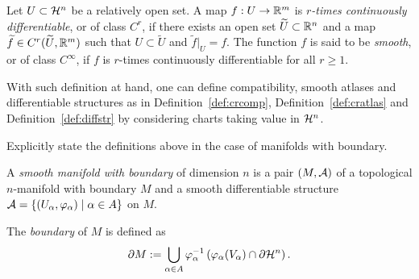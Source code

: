 \begin{definition}
  Let $U\subset\mathcal{H}^n$ be a relatively open set. A map $f: U\to\mathbb{R}^m$ is \emph{$r$-times continuously differentiable}, or of class $C^r$, if there exists an open set $\widetilde U\subset\mathbb{R}^n$ and a map $\widetilde f\in C^r(\widetilde U, \mathbb{R}^m)$ such that $U\subset\widetilde U$ and $\widetilde f|_U = f$.
  The function $f$ is said to be \emph{smooth}, or of class $C^\infty$, if $f$ is $r$-times continuously differentiable for all $r\geq 1$.
\end{definition}

With such definition at hand, one can define compatibility, smooth atlases and differentiable structures as in Definition~\ref{def:crcomp}, Definition~\ref{def:cratlas} and Definition~\ref{def:diffstr} by considering charts taking value in $\mathcal{H}^n$.

\begin{exercise}
  Explicitly state the definitions above in the case of manifolds with boundary.
\end{exercise}

\begin{definition}\label{def:diffmanifoldwb}
  A \emph{smooth manifold with boundary} of dimension $n$ is a pair $(M, \mathcal{A})$ of a topological $n$-manifold with boundary $M$ and a smooth differentiable structure $\mathcal{A} = \{(U_\alpha, \varphi_\alpha) \mid \alpha\in A\}$ on $M$.

  The \emph{boundary} of $M$ is defined as
  \begin{equation}\label{def:bdry}
    \partial M := \bigcup_{\alpha\in A} \varphi_\alpha^{-1}\left(\varphi_\alpha(V_\alpha)\cap \partial\mathcal{H}^n\right).
  \end{equation}
\end{definition}

